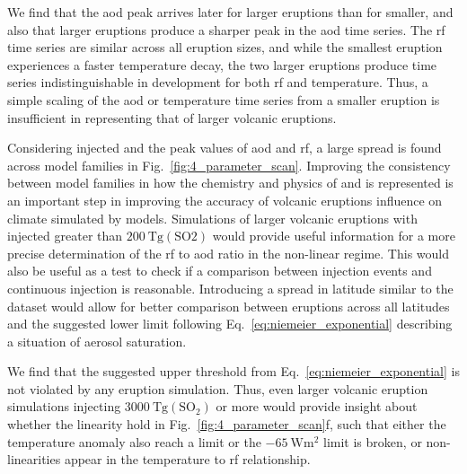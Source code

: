 \documentclass{ametsocV6.1}
\newcommand{\iso}[1][i]{{#1}njected \ce{SO2}}
\begin{document}
We find that the \gls{aod} peak arrives later for larger eruptions than for smaller, and
also that larger eruptions produce a sharper peak in the \gls{aod} time series. The
\gls{rf} time series are similar across all eruption sizes, and while the smallest
eruption experiences a faster temperature decay, the two larger eruptions produce time
series indistinguishable in development for both \gls{rf} and temperature. Thus, a
simple scaling of the \gls{aod} or temperature time series from a smaller eruption is
insufficient in representing that of larger volcanic eruptions.

Considering \iso{} and the peak values of \gls{aod} and \gls{rf}, a large spread is
found across model families in Fig.~\ref{fig:4_parameter_scan}. Improving the
consistency between model families in how the chemistry and physics of  and
 is represented is an important step in improving the accuracy of volcanic
eruptions influence on climate simulated by models.
Simulations of larger volcanic eruptions with \iso{} greater than
\(\SI{200}{\tera\gram(\mathrm{SO2})}\) would provide useful information for a more
precise determination of the \gls{rf} to \gls{aod} ratio in the non-linear regime. This
would also be useful as a test to check if a comparison between  injection
events and continuous  injection is reasonable. Introducing a spread in latitude
similar to the \citet{marshall2020dataset} dataset would allow for better comparison
between eruptions across all latitudes and the suggested lower limit following
Eq.~\ref{eq:niemeier_exponential} describing a situation of aerosol saturation.

We find that the suggested upper threshold from Eq.~\ref{eq:niemeier_exponential} is not
violated by any eruption simulation. Thus, even larger volcanic eruption simulations
injecting \(\SI{3000}{\tera\gram(\mathrm{SO_2})}\) or more would provide insight about
whether the linearity hold in Fig.~\ref{fig:4_parameter_scan}f, such that either the
temperature anomaly also reach a limit or the \(\SI{-65}{\watt\metre^{2}}\) limit is
broken, or non-linearities appear in the temperature to \gls{rf} relationship.
\end{document}
